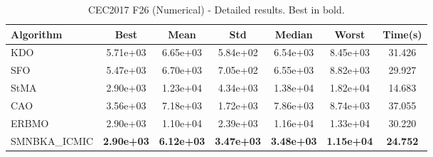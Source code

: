 \begin{table}[H]
\centering\small
\caption{CEC2017 F26 (Numerical) - Detailed results. Best in bold.}
\label{tab:cec2017_F26}
\begin{tabular}{lcccccc}
\toprule
\textbf{Algorithm} & \textbf{Best} & \textbf{Mean} & \textbf{Std} & \textbf{Median} & \textbf{Worst} & \textbf{Time(s)} \\
\midrule
KDO & 5.71e+03 & 6.65e+03 & 5.84e+02 & 6.54e+03 & 8.45e+03 & 31.426 \\
SFO & 5.47e+03 & 6.70e+03 & 7.05e+02 & 6.55e+03 & 8.82e+03 & 29.927 \\
StMA & 2.90e+03 & 1.23e+04 & 4.34e+03 & 1.38e+04 & 1.82e+04 & 14.683 \\
CAO & 3.56e+03 & 7.18e+03 & 1.72e+03 & 7.86e+03 & 8.74e+03 & 37.055 \\
ERBMO & 2.90e+03 & 1.10e+04 & 2.39e+03 & 1.16e+04 & 1.33e+04 & 30.220 \\
SMNBKA_ICMIC & \textbf{2.90e+03} & \textbf{6.12e+03} & \textbf{3.47e+03} & \textbf{3.48e+03} & \textbf{1.15e+04} & \textbf{24.752} \\
\bottomrule
\end{tabular}
\end{table}
